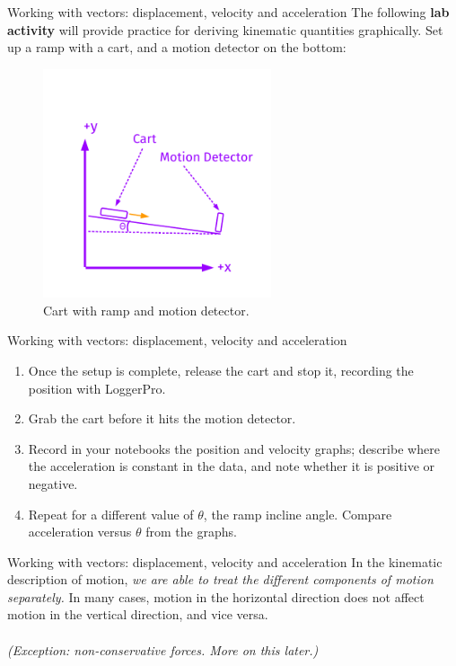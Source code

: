 \documentclass{beamer}
\begin{document}
\begin{frame}{Working with vectors: displacement, velocity and acceleration}
The following \textbf{lab activity} will provide practice for deriving kinematic quantities graphically.  Set up a ramp with a cart, and a motion detector on the bottom:
\begin{figure}
\includegraphics[width=0.6\textwidth,trim=0cm 1cm 0cm 2cm,clip=true]{figures/GraphAccel.pdf}
\caption{\label{fig:graphaccel} Cart with ramp and motion detector.}
\end{figure}
\end{frame}

\begin{frame}{Working with vectors: displacement, velocity and acceleration}
\begin{enumerate}
\item Once the setup is complete, release the cart and stop it, recording the position with LoggerPro.
\item Grab the cart before it hits the motion detector.
\item Record in your notebooks the position and velocity graphs; describe where the acceleration is constant in the data, and note whether it is positive or negative.
\item Repeat for a different value of $\theta$, the ramp incline angle.  Compare acceleration versus $\theta$ from the graphs.
\end{enumerate}
\end{frame}

\begin{frame}{Working with vectors: displacement, velocity and acceleration}
In the kinematic description of motion, \alert{\textit{we are able to treat the different components of motion separately.}}  In many cases, motion in the horizontal direction does not affect motion in the vertical direction, and vice versa.\\
\vspace{0.5cm}
\small
{} \\
\vspace{1cm}
\textit{(Exception: non-conservative forces.  More on this later.)}
\end{frame}
\end{document}
